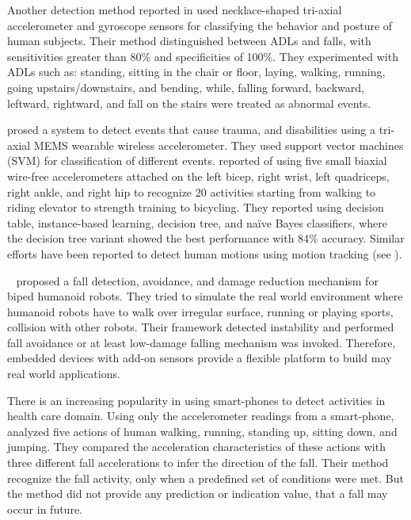 \documentclass[]{IEEEtran}
\begin{document}
Another detection method reported in\cite{baekFallDetection2013} used necklace-shaped tri-axial
accelerometer  and  gyroscope  sensors  for classifying  the  behavior  and  posture  of  human
 subjects. Their method distinguished between  ADLs and  falls, with  sensitivities  greater  than 
 80\%  and specificities  of  100\%. They experimented with ADLs such as: standing, sitting in the 
 chair or floor, laying, walking, running, going upstairs/downstairs, and bending, while, 
 falling forward, backward, leftward, rightward, and fall on the stairs were treated as abnormal 
 events. 
 
\cite{leoneFallDetection2013} prosed a system to detect events that cause trauma, and disabilities
using a tri-axial MEMS wearable wireless accelerometer. They used support vector machines (SVM) for
classification of different events. \cite{BaoActivityrecognition2004} reported of using five 
small biaxial wire-free accelerometers attached  on the left bicep, right wrist, left quadriceps, 
right ankle, and right hip to recognize 20 activities starting from  walking  to  riding elevator  
to  strength  training to bicycling. They reported using decision table, instance-based learning, 
decision tree, and na\"{i}ve Bayes classifiers, where the decision tree variant showed the best performance 
with 84\% accuracy.  Similar efforts have been reported to detect human motions using motion 
tracking (see 
\cite{dumitracheFallDetection2013,kumarActivitAndFallDetection2013,krishnanActivityRecognition2014,gaoActivityRecognition2014,alvarezActivityAndFallRecognotion2015}).
 


{~\cite{moyaFallAndDamageDetection2015}} proposed a fall detection, avoidance, and damage 
reduction mechanism for biped humanoid robots. They tried to simulate the real world environment 
where humanoid robots have to walk over irregular surface, running or playing sports, collision 
with other robots. Their framework detected instability and performed fall avoidance or at 
least low-damage falling mechanism was invoked. Therefore, embedded devices  with add-on sensors 
provide a flexible platform to build may real world applications. 


There is an increasing popularity in using smart-phones to detect activities in health care domain. 
Using only the accelerometer readings from a smart-phone, \cite{baiFallDetectionPhone2013} analyzed five 
actions of human walking, running, standing up, sitting down, and jumping. They compared the 
acceleration characteristics of these actions with three different fall accelerations to infer the 
direction of the fall. Their method recognize the fall activity, only when a predefined set of 
conditions were met. But the method did not provide any prediction or indication value, that a fall 
may occur in future. 
\end{document}
